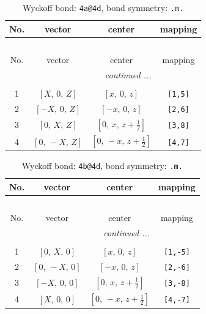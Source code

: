 \documentclass[fleqn,8pt]{jsarticle}
\begin{document}
\begin{longtable}{cccc}
\caption{Wyckoff bond: {\tt 4a@4d}, bond symmetry: {\tt .m.}}
 \\
 \hline \hline
No. & vector & center & mapping \\ \hline \endfirsthead

\multicolumn{3}{l}{\tablename\ \thetable{}} \\
 \hline \hline
No. & vector & center & mapping \\ \hline \endhead

 \hline \hline
\multicolumn{3}{r}{\footnotesize\it continued ...} \\ \endfoot

 \hline \hline
\multicolumn{3}{r}{} \\ \endlastfoot

1 & $\left[ X,\, 0,\, Z \right]$ & $\left[ x,\, 0,\, z \right]$ & {\tt [1,5]} \\ \hline
2 & $\left[ - X,\, 0,\, Z \right]$ & $\left[ - x,\, 0,\, z \right]$ & {\tt [2,6]} \\ \hline
3 & $\left[ 0,\, X,\, Z \right]$ & $\left[ 0,\, x,\, z + \frac{1}{2} \right]$ & {\tt [3,8]} \\ \hline
4 & $\left[ 0,\, - X,\, Z \right]$ & $\left[ 0,\, - x,\, z + \frac{1}{2} \right]$ & {\tt [4,7]} \\
\end{longtable}
\renewcommand{\arraystretch}{1.2}
\begin{longtable}{cccc}
\caption{Wyckoff bond: {\tt 4b@4d}, bond symmetry: {\tt .m.}}
 \\
 \hline \hline
No. & vector & center & mapping \\ \hline \endfirsthead

\multicolumn{3}{l}{\tablename\ \thetable{}} \\
 \hline \hline
No. & vector & center & mapping \\ \hline \endhead

 \hline \hline
\multicolumn{3}{r}{\footnotesize\it continued ...} \\ \endfoot

 \hline \hline
\multicolumn{3}{r}{} \\ \endlastfoot

1 & $\left[ 0,\, X,\, 0 \right]$ & $\left[ x,\, 0,\, z \right]$ & {\tt [1,-5]} \\ \hline
2 & $\left[ 0,\, - X,\, 0 \right]$ & $\left[ - x,\, 0,\, z \right]$ & {\tt [2,-6]} \\ \hline
3 & $\left[ - X,\, 0,\, 0 \right]$ & $\left[ 0,\, x,\, z + \frac{1}{2} \right]$ & {\tt [3,-8]} \\ \hline
4 & $\left[ X,\, 0,\, 0 \right]$ & $\left[ 0,\, - x,\, z + \frac{1}{2} \right]$ & {\tt [4,-7]} \\
\end{longtable}
\end{document}

